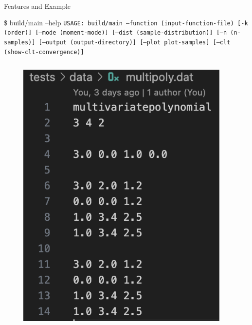 \documentclass[8pt]{beamer}
\begin{document}
\begin{frame}{Features and Example}
    \begin{block}{\$ build/main --help}
        \texttt{USAGE: build/main --function (input-function-file) [-k (order)] [--mode (moment-mode)] [--dist (sample-distribution)] [--n (n-samples)] [--output (output-directory)] [--plot plot-samples] [--clt (show-clt-convergence)]}
    \end{block}
    \begin{columns}[T]
         {
            \centering
            \begin{figure} \centering \includegraphics[height=.35\textheight]{img/usage_multipoly.png} \end{figure}
        }
         {
            \centering
}
\end{columns}
\end{frame}
\end{document}
